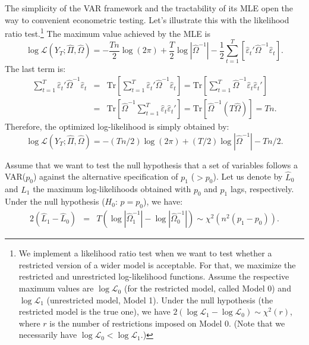\documentclass[
  11pt,
]{book}
\theoremstyle{definition}
\theoremstyle{definition}
\theoremstyle{definition}
\theoremstyle{definition}
\theoremstyle{remark}
\begin{document}
The simplicity of the VAR framework and the tractability of its MLE open the way to convenient econometric testing. Let's illustrate this with the likelihood ratio test.\footnote{We implement a likelihood ratio test when we want to test whether a restricted version of a wider model is acceptable. For that, we maximize the restricted and unrestricted log-likelihood functions. Assume the respective maximum values are \(\log \mathcal{L}_0\) (for the restricted model, called Model 0) and \(\log \mathcal{L}_1\) (unrestricted model, Model 1). Under the null hypothesis (the restricted model is the true one), we have \(2(\log \mathcal{L}_1 - \log \mathcal{L}_0) \sim \chi^2(r)\), where \(r\) is the number of restrictions imposed on Model 0. (Note that we necessarily have \(\log \mathcal{L}_0 < \log \mathcal{L}_1\).)} The maximum value achieved by the MLE is
\[
\log\mathcal{L}(Y_{T};\hat{\Pi},\hat{\Omega}) = -\frac{Tn}{2}\log(2\pi)+\frac{T}{2}\log\left|\hat{\Omega}^{-1}\right| -\frac{1}{2}\sum_{t=1}^{T}\left[\hat{\varepsilon}_{t}'\hat{\Omega}^{-1}\hat{\varepsilon}_{t}\right].
\]
The last term is:
\begin{eqnarray*}
\sum_{t=1}^{T}\hat{\varepsilon}_{t}'\hat{\Omega}^{-1}\hat{\varepsilon}_{t} &=& \mbox{Tr}\left[\sum_{t=1}^{T}\hat{\varepsilon}_{t}'\hat{\Omega}^{-1}\hat{\varepsilon}_{t}\right] = \mbox{Tr}\left[\sum_{t=1}^{T}\hat{\Omega}^{-1}\hat{\varepsilon}_{t}\hat{\varepsilon}_{t}'\right]\\
&=&\mbox{Tr}\left[\hat{\Omega}^{-1}\sum_{t=1}^{T}\hat{\varepsilon}_{t}\hat{\varepsilon}_{t}'\right] = \mbox{Tr}\left[\hat{\Omega}^{-1}\left(T\hat{\Omega}\right)\right]=Tn.
\end{eqnarray*}
Therefore, the optimized log-likelihood is simply obtained by:
\begin{equation}
\log\mathcal{L}(Y_{T};\hat{\Pi},\hat{\Omega})=-(Tn/2)\log(2\pi)+(T/2)\log\left|\hat{\Omega}^{-1}\right|-Tn/2.\label{eq:optimzedLogL}
\end{equation}

Assume that we want to test the null hypothesis that a set of variables follows a VAR(\(p_{0}\)) against the alternative specification of \(p_{1}\) (\(>p_{0}\)). Let us denote by \(\hat{L}_{0}\) and \(\hat{L}_{1}\) the maximum log-likelihoods obtained with \(p_{0}\) and \(p_{1}\) lags, respectively. Under the null hypothesis (\(H_0\): \(p=p_0\)), we have:
\begin{eqnarray*}
2\left(\hat{L}_{1}-\hat{L}_{0}\right)&=&T\left(\log\left|\hat{\Omega}_{1}^{-1}\right|-\log\left|\hat{\Omega}_{0}^{-1}\right|\right)  \sim \chi^2(n^{2}(p_{1}-p_{0})).
\end{eqnarray*}
\end{document}

